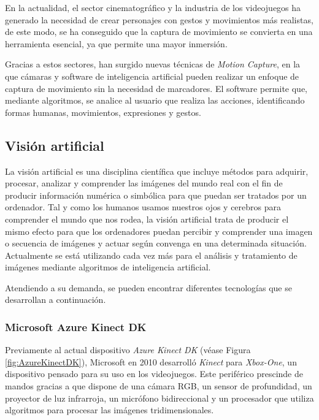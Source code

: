 En la actualidad, el sector cinematográfico y la industria de los videojuegos ha generado la necesidad de crear personajes con gestos y movimientos más realistas, de este modo, se ha conseguido que la captura de movimiento se convierta en una herramienta esencial, ya que permite una mayor inmersión. 

Gracias a estos sectores, han surgido nuevas técnicas de \textit{Motion Capture}, en la que cámaras y software de inteligencia artificial pueden realizar un enfoque de captura de movimiento sin la necesidad de marcadores. El software permite que, mediante algoritmos, se analice al usuario que realiza las acciones, identificando formas humanas, movimientos, expresiones y gestos.


\subsection{Visión artificial}

La visión artificial \cite{Visionartificial} es una disciplina científica que incluye métodos para adquirir, procesar, analizar y comprender las imágenes del mundo real con el fin de producir información numérica o simbólica para que puedan ser tratados por un ordenador. Tal y como los humanos usamos nuestros ojos y cerebros para comprender el mundo que nos rodea, la visión artificial trata de producir el mismo efecto para que los ordenadores puedan percibir y comprender una imagen o secuencia de imágenes y actuar según convenga en una determinada situación. Actualmente se está utilizando cada vez más para el análisis y tratamiento de imágenes mediante algoritmos de inteligencia artificial. 

Atendiendo a su demanda, se pueden encontrar diferentes tecnologías que se desarrollan a continuación.

\subsubsection{Microsoft Azure Kinect DK}

Previamente al actual dispositivo \textit{Azure Kinect DK} (véase Figura \ref{fig:AzureKinectDK}), Microsoft en 2010 desarrolló \textit{Kinect} para \textit{Xbox-One}, un dispositivo pensado para su uso en los videojuegos. Este periférico prescinde de mandos gracias a que dispone de una cámara RGB, un sensor de profundidad, un proyector de luz infrarroja, un micrófono bidireccional y un procesador que utiliza algoritmos para procesar las imágenes tridimensionales.

